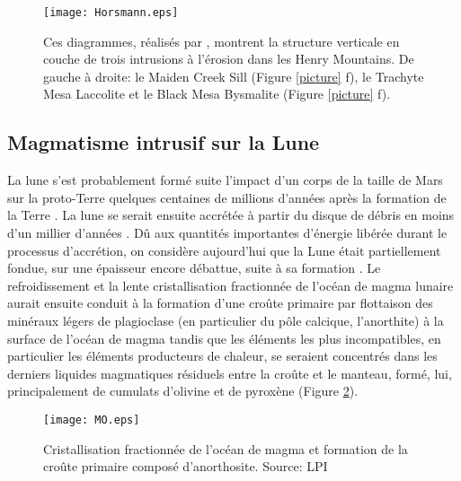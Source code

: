 \begin{figure}[htpb]
  \begin{center}
    \graphicspath{ {/Users/thorey/Documents/These/Manuscript/Figure/Chapter1/} }
    \texttt{[image: Horsmann.eps]}
    \caption{Ces  diagrammes,  réalisés  par  \citet{Horsman:2009gea},
      montrent la structure verticale en  couche de trois intrusions à
      l'érosion  dans les  Henry  Mountains. De  gauche  à droite:  le
      Maiden  Creek Sill  (Figure \ref{picture}  f), le  Trachyte Mesa
      Laccolite et le Black Mesa Bysmalite (Figure \ref{picture} f).}
    \label{Horsmann}
  \end{center}
\end{figure}

\subsection{Magmatisme intrusif sur la Lune}
\label{sec:moon}

La  lune s'est  probablement formé  suite  l'impact d'un  corps de  la
taille  de Mars  sur  la proto-Terre  quelques  centaines de  millions
d'années      après      la       formation      de      la      Terre
\citep{Cameron:1991vu,Canup:2001eb,Canup:2012cd}.   La lune  se serait
ensuite accrétée  à partir du disque  de débris en moins  d'un millier
d'années  \citep{Mizutani:1972hc}.    Dû  aux   quantités  importantes
d'énergie  libérée  durant  le  processus  d'accrétion,  on  considère
aujourd'hui que la Lune était  partiellement fondue, sur une épaisseur
encore débattue, suite à sa formation \citep{ElkinsTanton:2011ce}.  Le
refroidissement et la lente  cristallisation fractionnée de l'océan de
magma  lunaire aurait  ensuite  conduit à  la  formation d'une  croûte
primaire  par  flottaison  des  minéraux  légers  de  plagioclase  (en
particulier du pôle calcique, l'anorthite)  à la surface de l'océan de
magma tandis que  les éléments les plus  incompatibles, en particulier
les éléments producteurs  de chaleur, se seraient  concentrés dans les
derniers liquides magmatiques résiduels entre la croûte et le manteau,
formé,  lui,  principalement  de  cumulats d'olivine  et  de  pyroxène
(Figure \ref{MO}).

\begin{figure}[htpb]
  \begin{center}
    \graphicspath{ {/Users/thorey/Documents/These/Manuscript/Figure/Chapter1/} }
    \texttt{[image: MO.eps]}
    \caption{Cristallisation  fractionnée  de   l'océan  de  magma  et
      formation de  la croûte primaire composé  d'anorthosite. Source:
      LPI}
    \label{MO}
  \end{center}
\end{figure}

